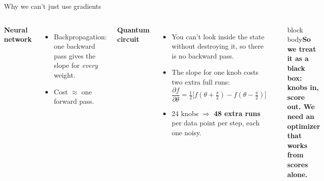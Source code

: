 \documentclass[aspectratio=169,11pt]{beamer}
\newcommand{\takeaway}[1]{\begin{beamercolorbox}[rounded=true,sep=6pt,wd=\textwidth]{block body}\textbf{#1}\end{beamercolorbox}}
\begin{document}
\begin{frame}{Why we can't just use gradients}
  \small
  \begin{columns}[T]
      \textbf{Neural network}
      \begin{itemize}
        \item Backpropagation: one backward pass gives the slope for \emph{every} weight.
        \item Cost $\approx$ one forward pass.
      \end{itemize}
      \vspace{0.6em}
      \textbf{Quantum circuit}
      \begin{itemize}
        \item You can't look inside the state without destroying it, so there is no backward pass.
        \item The slope for one knob costs two extra full runs:
          \[ \frac{\partial f}{\partial \theta} = \tfrac{1}{2}\big[f(\theta + \tfrac{\pi}{2}) - f(\theta - \tfrac{\pi}{2})\big] \]
        \item 24 knobs $\Rightarrow$ \textbf{48 extra runs} per data point per step, each one noisy.
      \end{itemize}
      \vspace{1.2em}
      \begin{center}
      \end{center}
      \vspace{0.6em}
      \takeaway{So we treat it as a black box: knobs in, score out. We need an optimizer that works from scores alone.}
  \end{columns}
\end{frame}
\end{document}
